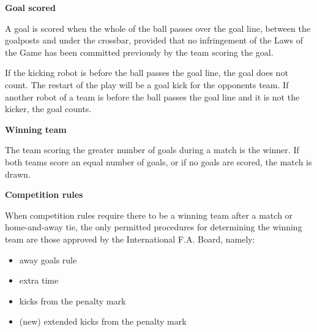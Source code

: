 \clearpage
\sffamily
{\bfseries\color[rgb]{0.4,0.4,0.4}{Law 10 -- The Method of Scoring} }
{}

\bigskip

{\bfseries Goal scored }

\headlinebox

A goal is scored when the whole of the ball passes over the goal line,
between the goalposts and under the crossbar,
provided that no infringement of the Laws of the Game has been committed
previously by the team scoring the goal.

\bigskip

If the kicking robot is   before the ball passes the goal line,
 the goal does not count.
The restart of the play will be a goal kick for the opponents team.
If another robot of a team is   before the ball
passes the goal line and it is not the kicker,  the goal counts.

\bigskip

{\bfseries Winning team}

\headlinebox

The team scoring the greater number of goals during a match is the winner. If both teams score an equal number of goals, or if no goals are scored, the match is drawn. 

\bigskip

{\bfseries Competition rules }

\headlinebox

When competition rules require there to be a winning team after a match or home-and-away tie, the only permitted procedures for determining the winning team are those approved by the International F.A. Board, namely:

\begin{itemize}
\item away goals rule
\item extra time
\item kicks from the penalty mark
\item (new) extended kicks from the penalty mark
\end{itemize}


{\bfseries {}}

\removed{\headlinebox}

